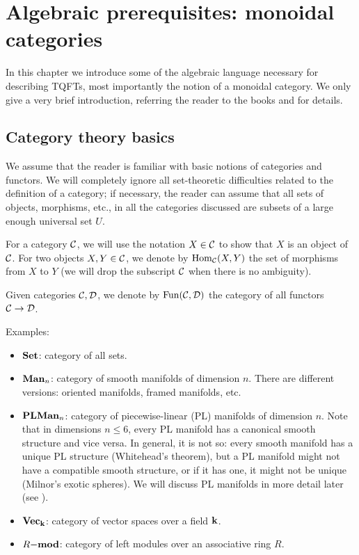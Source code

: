 \chapter{Algebraic prerequisites: monoidal categories}\label{c:categories}

In this chapter we introduce some of the algebraic language
necessary for describing TQFTs, most importantly the notion
of a monoidal category. We only give a very brief introduction,
referring the reader to the books \cite{mac-lane} and \cite{etingof-fusion}
for details.

\section{Category theory basics}\label{s:category-basics}
We assume that the reader is familiar with basic notions of categories and
functors. We will completely ignore all set-theoretic difficulties related
to the definition of a category; if necessary, the reader can assume that
all sets of objects, morphisms, etc., in all the categories discussed are
subsets of a large enough universal set $U$.

For a category $\calC$, we will use the notation $X\in \calC$ to show that
$X$ is an object of $\calC$. For two objects $X,Y\in\calC$, we denote by
$\Hom_\calC(X,Y)$ the set of morphisms from $X$ to $Y$ (we will drop
the subscript $\calC$ when there is no ambiguity).

Given categories $\calC, \calD$, we denote by $\Fun(\calC, \calD)$ the
category of all functors $\calC\to \calD$.

Examples:
\begin{itemize}
  \item $\sets$: category of all sets.
  \item $\smoothman_n$: category of smooth manifolds of dimension $n$.
    There are different versions: oriented manifolds, framed manifolds, etc.
  \item $\plman_n$: category of piecewise-linear (PL) manifolds of
    dimension $n$.
     Note that
    in dimensions $n\le 6$, every PL manifold has a canonical smooth structure
    and vice versa. In general, it is not so: every smooth manifold has
    a unique PL structure (Whitehead's theorem), but a PL manifold might
    not have a compatible smooth structure, or if it has one, it might not
    be unique (Milnor's exotic spheres). We will discuss PL manifolds in
    more detail later (see ).
  \item $\vect_\kk$: category of vector spaces over a field $\kk$.
  \item $R\mod$: category of left modules over an associative ring $R$.
\end{itemize}

